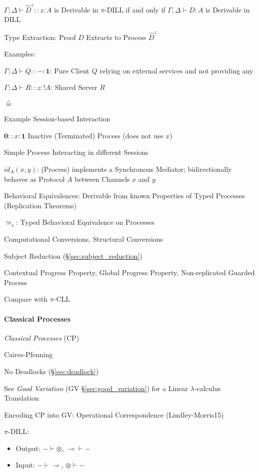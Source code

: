 $\Gamma; \Delta \vdash \hat{D}^z :: z:A$ is Derivable in $\pi$-DILL if
and only if $\Gamma; \Delta \vdash D : A$ is Derivable in DILL

Type Extraction: Proof $D$ Extracts to Process $\hat{D}^z$

Examples:

$\Gamma; \Delta \vdash Q :: -:\mathbf{1}$: Pure Client $Q$ relying on
external services and not providing any

$\Gamma; \Delta \vdash R :: z:!A$: Shared Server $R$

$\stackrel{\triangle}{=}$

Example Session-based Interaction %

$\mathbf{0} :: x : \mathbf{1}$ Inactive (Terminated) Process (does not
use $x$)

Simple Process Interacting in different Sessions %

$id_A(x,y)$: (Process) implements a Synchronous Mediator;
bidirectionally behaves as Protocol $A$ between Channels $x$ and $y$

Behavioral Equivalences: Derivable from known Properties of Typed
Processes (Replication Theorems)

$\simeq_s$: Typed Behavioral Equivalence on Processes

Computational Conversions, Structural Conversions

Subject Reduction (\S\ref{sec:subject_reduction})

Contextual Progress Property, Global Progress Property,
Non-replicated Guarded Process %

Compare with $\pi$-CLL %



\paragraph{Classical Processes}\label{sec:classical_processes}\hfill
\cite{wadler12}

\emph{Classical Processes} (CP)

Caires-Pfenning \cite{caires-pfenning10}

No Deadlocks (\S\ref{sec:deadlock})

\fist See \emph{Good Variation} (GV \S\ref{sec:good_variation}) for a
Linear $\lambda$-calculus Translation

Encoding CP into GV: Operational Correspondence (Lindley-Morris15)


$\pi$-DILL:
\begin{itemize}
  \item Output: $- \vdash \otimes$, $\multimap \vdash -$

  \item Input: $- \vdash \multimap$, $\otimes \vdash -$
\end{itemize}

